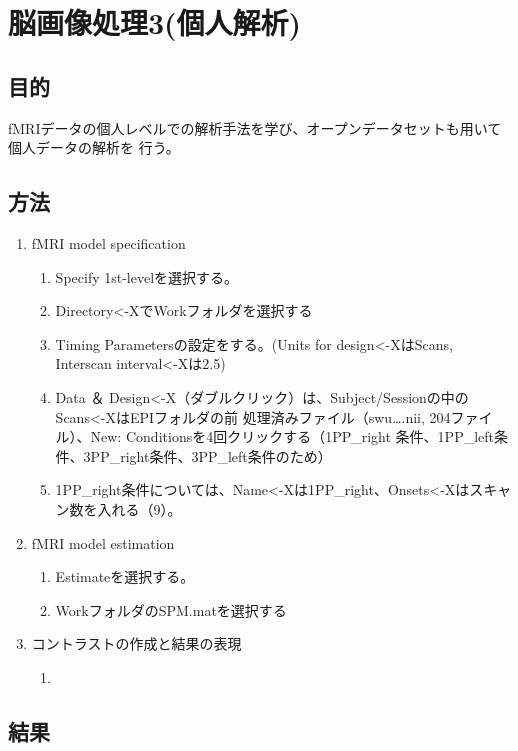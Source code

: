 \documentclass{jlreq}
\begin{document}
\section{脳画像処理3(個人解析)}
\subsection{目的}
fMRIデータの個人レベルでの解析手法を学び、オープンデータセットも用いて個人データの解析を
行う。
\subsection{方法}
\begin{enumerate}
    \item fMRI model specification
    \begin{enumerate}
        \item Specify 1st-levelを選択する。
        \item Directory<-XでWorkフォルダを選択する
        \item Timing Parametersの設定をする。(Units for design<-XはScans, Interscan interval<-Xは2.5)
        \item Data ＆ Design<-X（ダブルクリック）は、Subject/Sessionの中のScans<-XはEPIフォルダの前
処理済みファイル（swu….nii, 204ファイル）、New: Conditionsを4回クリックする（1PP\_right
条件、1PP\_left条件、3PP\_right条件、3PP\_left条件のため）
        \item 1PP\_right条件については、Name<-Xは1PP\_right、Onsets<-Xはスキャン数を入れる（9）。
    \end{enumerate}

    \item fMRI model estimation
    \begin{enumerate}
        \item Estimateを選択する。
        \item WorkフォルダのSPM.matを選択する
    \end{enumerate}

    \item コントラストの作成と結果の表現
    \begin{enumerate}
        \item 
    \end{enumerate}
\end{enumerate}

\subsection{結果}
\end{document}
